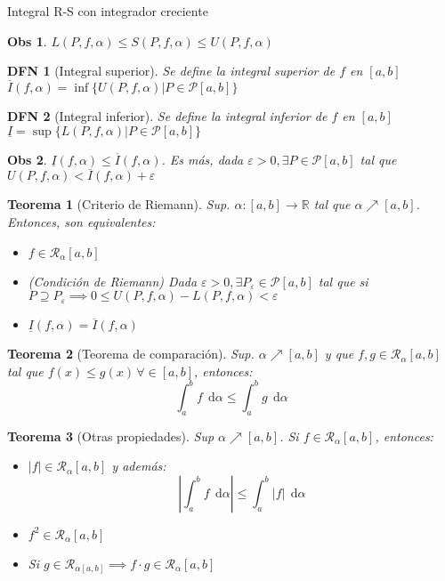\documentclass[a4paper]{article}\usepackage{/home/alonso/Documents/Projects/formularios/styles}
\newtheorem{definition}{DFN}
\theoremstyle{mytheoremstyle}
\newtheorem{theorem}{Teorema}
\newtheorem*{obs}{Obs}
\newcommand{\R}{\mathbb{R}}
\newcommand{\1}{\mathds{1}}
\newcommand{\diff}[1]{\,\mathrm{d}#1}
\begin{document}
\begin{multicols*}{3}
\begin{roundbox}{Integral R-S con integrador creciente}
	\begin{obs}
		$ L(P,f,\alpha) \leq S(P,f,\alpha) \leq U(P,f,\alpha)$
	\end{obs}

	\begin{definition}[Integral superior]
		Se define la integral superior de $ f $ en $ [a,b] $
		$ \overline{I}(f,\alpha) = \inf \{ U(P,f,\alpha) | P \in \mathcal{P}[a,b]\} $
	\end{definition}

	\begin{definition}[Integral inferior]
		Se define la integral inferior de $ f $ en $ [a,b] $
		$ \underline{I} = \sup \{ L(P,f,\alpha) | P \in \mathcal{P}[a,b]\} $
	\end{definition}

	\begin{obs}
		$ \underline{I}(f,\alpha) \leq \overline{I}(f,\alpha) $. Es más, dada $ \varepsilon > 0, \exists P \in \mathcal{P}[a,b] $ tal que $ U(P,f,\alpha) < \overline{I}(f,\alpha) + \varepsilon $
	\end{obs}

	\begin{theorem}[Criterio de Riemann]
		Sup. $ \alpha : [a,b] \to \R  $ tal que $ \alpha \nearrow [a,b] $. Entonces, son equivalentes:
		\begin{itemize}
			\item $ f \in \mathcal{R}_{\alpha}[a,b] $
			\item (Condición de Riemann) Dada $ \varepsilon > 0, \exists P_{\varepsilon} \in \mathcal{P}[a,b]$ tal que si $  P \supseteq  P_{\varepsilon} \implies 0 \leq U(P,f,\alpha) - L(P,f,\alpha) < \varepsilon$
			\item $ \underline{I}(f,\alpha) = \overline{I}(f,\alpha) $
		\end{itemize}
	\end{theorem}

	\begin{theorem}[Teorema de comparación]
		Sup. $ \alpha \nearrow [a,b] $ y que $ f,g \in \mathcal{R}_{\alpha}[a,b]$ tal que $ f(x) \leq g(x) \, \forall \in [a,b] $, entonces:
		\[
			\int_{a}^{b} f \; \diff{\alpha}  \leq \int_{a}^{b} g \; \diff{\alpha}
		\]
	\end{theorem}

	\begin{theorem}[Otras propiedades]
		Sup $ \alpha \nearrow [a,b] $. Si $  f \in \mathcal{R}_{\alpha}[a,b]$, entonces:
		\begin{itemize}
			\item $ |f| \in \mathcal{R}_{\alpha}[a,b]$ y además:
				\[
					\left| {\int_{a}^{b} f \; \diff{\alpha} } \right| \leq \int_{a}^{b} |f|  \; \diff{\alpha}
				\]
			\item $ f^{2} \in \mathcal{R}_{\alpha}[a,b] $
			\item Si $ g \in \mathcal{R}_{\alpha[a,b]} \implies f \cdot g \in \mathcal{R}_{\alpha}[a,b] $
		\end{itemize}
	\end{theorem}
\end{roundbox}


\end{multicols*}
\end{document}
